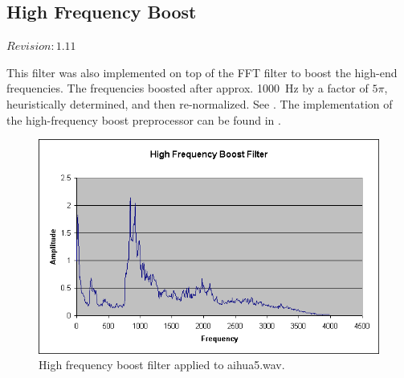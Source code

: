 \subsection{High Frequency Boost}

$Revision: 1.11 $

This filter was also implemented on top of the FFT filter to boost the high-end
frequencies. The frequencies boosted after approx. 1000~Hz by a factor
of $5\pi$, heuristically determined, and then re-normalized. See .
The implementation of the high-frequency boost preprocessor can be found in
.

\begin{figure}
	\centering
	\includegraphics[width=400pt]{../graphics/graphs/high-frequency-boost.png}
	\caption{High frequency boost filter applied to aihua5.wav.}
	\label{fig:high-boost}
\end{figure}


